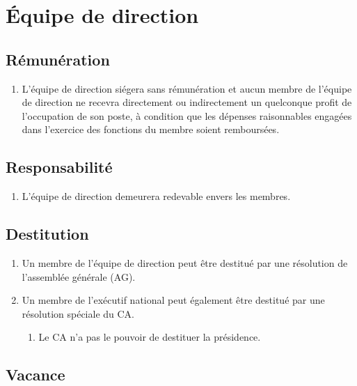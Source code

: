 \section{Équipe de direction}
\label{equipe-de-direction}

\subsection{Rémunération}
\label{equipe-de-direction-remuneration}

\begin{enumerate}
 \item L'équipe de direction siégera sans rémunération et aucun membre de l'équipe de direction ne recevra directement ou indirectement un quelconque profit de l'occupation de son poste, à condition que les dépenses raisonnables engagées dans l'exercice des fonctions du membre soient remboursées.
\end{enumerate}

\subsection{Responsabilité}
\label{equipe-de-direction-responsabilite}

\begin{enumerate}
 \item L'équipe de direction demeurera redevable envers les membres.
\end{enumerate}

\subsection{Destitution}
\label{equipe-de-direction-destitution}

\begin{enumerate}
 \item Un membre de l'équipe de direction peut être destitué par une résolution de l'assemblée générale (AG).
 \item Un membre de l'exécutif national peut également être destitué par une résolution spéciale du CA.
  \begin{enumerate}
   \item Le CA n'a pas le pouvoir de destituer la présidence.
  \end{enumerate}
\end{enumerate}

\subsection{Vacance}
\label{equipe-de-direction-vacance}


